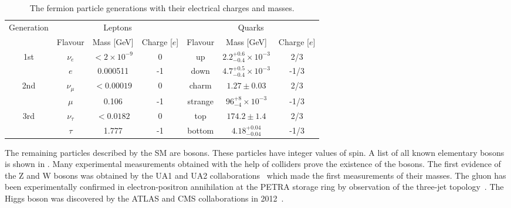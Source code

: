 \begin{table*}[h]
\begin{center}
\begin{tabular}{c||c|c|c||c|c|c}
\multirow{2}{*}{Generation} & \multicolumn{3}{c||}{Leptons} & \multicolumn{3}{c}{Quarks} \\
\cline{2-7}
 & Flavour & Mass [GeV] & Charge [$e$] &  Flavour & Mass [GeV] & Charge [$e$] \\
\hline
\multirow{2}{*}{1st} & $\nu_e$ & $<2\times10^{-9}$ & 0 & up & $2.2^{+0.6}_{-0.4}\times10^{-3}$ & 2/3 \\
 & $e$ & 0.000511 & -1 & down & $4.7^{+0.5}_{-0.4}\times10^{-3}$ & -1/3 \\
\cline{1-7} 
\multirow{2}{*}{2nd} & $\nu_{\mu}$ & $<0.00019$ & 0 & charm & $1.27\pm0.03$ & 2/3 \\
 & $\mu$ & 0.106 & -1 & strange & $96^{+8}_{-4}\times10^{-3}$ & -1/3 \\
\cline{1-7}
\multirow{2}{*}{3rd} & $\nu_{\tau}$ & $<0.0182$ & 0 & top & $174.2\pm1.4$ & 2/3 \\
 & $\tau$ & 1.777 & -1 & bottom & $4.18^{+0.04}_{-0.04}$ & -1/3 \\
\end{tabular}
\end{center}
 \caption{The fermion particle generations with their electrical charges and masses.}
\label{tab:fermions}
\end{table*}

The remaining particles described by the SM are bosons. These particles have integer values of spin.
A list of all known elementary bosons is shown in .
Many experimental measurements obtained with the help of colliders prove the existence of the bosons.
The first evidence of the Z and W bosons was obtained by the UA1 and UA2 collaborations~\cite{ARNISON1983103, BAGNAIA1983130}
which made the first measurements of their masses.
The gluon has been experimentally confirmed 
in electron-positron annihilation at the PETRA storage ring by observation
of the three-jet topology~\cite{three_jet_event}.
The Higgs boson was discovered by the ATLAS and CMS collaborations in 2012~\cite{Aad2012tfa, Chatrchyan2012ufa}.

